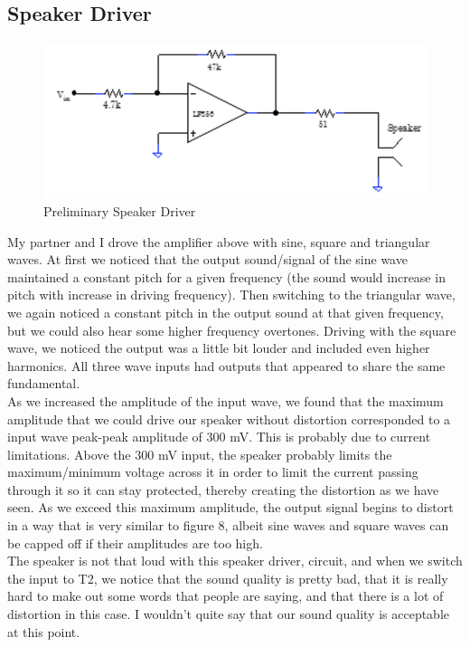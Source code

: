 \documentclass{article}
\begin{document}
\subsection{Speaker Driver}
    \begin{figure}[H]
        \centering
        \includegraphics[scale = 0.5]{7.png}
        \caption{Preliminary Speaker Driver \cite{lab8}}
        \label{fig:my_label}
    \end{figure}
    My partner and I drove the amplifier above with sine, square and triangular waves. At first we noticed that the output sound/signal of the sine wave maintained a constant pitch for a given frequency (the sound would increase in pitch with increase in driving frequency). Then switching to the triangular wave, we again noticed a constant pitch in the output sound at that given frequency, but we could also hear some higher frequency overtones. Driving with the square wave, we noticed the output was a little bit louder and included even higher harmonics. All three wave inputs had outputs that appeared to share the same fundamental. \\\indent As we increased the amplitude of the input wave, we found that the maximum amplitude that we could drive our speaker without distortion corresponded to a input wave peak-peak amplitude of 300 mV. This is probably due to current limitations. Above the 300 mV input, the speaker probably limits the maximum/minimum voltage across it in order to limit the current passing through it so it can stay protected, thereby creating the distortion as we have seen. As we exceed this maximum amplitude, the output signal begins to distort in a way that is very similar to figure 8, albeit sine waves and square waves can be capped off if their amplitudes are too high.\\\indent The speaker is not that loud with this speaker driver, circuit, and when we switch the input to T2, we notice that the sound quality is pretty bad, that it is really hard to make out some words that people are saying, and that there is a lot of distortion in this case. I wouldn't quite say that our sound quality is acceptable at this point.
\end{document}
